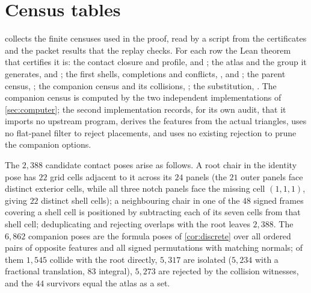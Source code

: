 \section{Census tables}\label{app:census}

 collects the finite censuses used in the proof, read by a script from the
certificates and the packet results that the replay checks. For each row the Lean theorem that
certifies it is: the contact closure and profile,  and
; the atlas and the group it generates,  and
; the first shells, completions and conflicts,
,  and ; the parent
census, ; the companion census and its collisions,
; the substitution, . The companion
census is computed by the two independent implementations of \cref{sec:computer}; the second
implementation records, for its own audit, that it imports no upstream program, derives the
features from the actual triangles, uses no flat-panel filter to reject placements, and uses no
existing rejection to prune the companion options.

\begin{table}[ht]
  \centering
  \caption{The censuses (FIGURES.md, Table 2).}
  \label{tab:census}
  \small
  
\end{table}

The $2{,}388$ candidate contact poses arise as follows. A root chair in the identity pose has $22$
grid cells adjacent to it across its $24$ panels (the $21$ outer panels face distinct exterior
cells, while all three notch panels face the missing cell $(1,1,1)$, giving $22$ distinct shell
cells); a neighbouring chair in one of
the $48$ signed frames covering a shell cell is positioned by subtracting each of its seven cells
from that shell cell; deduplicating and rejecting overlaps with the root leaves $2{,}388$. The
$6{,}862$ companion poses are the formula poses of \cref{cor:discrete} over all ordered pairs of
opposite features and all signed permutations with matching normals; of them $1{,}545$ collide with
the root directly, $5{,}317$ are isolated ($5{,}234$ with a fractional translation, $83$ integral),
$5{,}273$ are rejected by the collision witnesses, and the $44$ survivors equal the atlas as a
set.
